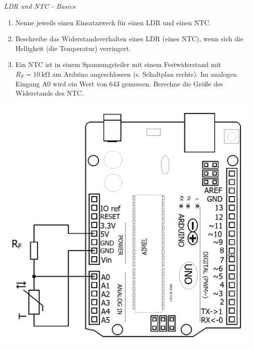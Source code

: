 \documentclass[ngerman, 11pt]{scrreprt}
\begin{document}
	\begin{aufgabe} \emph{LDR und NTC - Basics}
		
		\medskip
		\begin{minipage}{0.59\textwidth}
			\begin{enumerate}[label=\alph*), itemsep=0mm, parsep=0mm]
				\item Nenne jeweils einen Einsatzzweck für einen LDR und einen NTC.
				\item Beschreibe das Widerstandsverhalten eines LDR (eines NTC), wenn sich die Helligkeit (die Temperatur) verringert.
				\item Ein NTC ist in einem Spannungsteiler mit einem Festwiderstand mit $R_F=\SI{10}{\kilo\ohm}$ am Arduino angeschlossen (s. Schaltplan rechts). Im analogen Eingang A0 wird ein Wert von 643 gemessen. Berechne die Größe des Widerstands des NTC.
			\end{enumerate}
		\end{minipage}
		\hfill
		\begin{minipage}{0.39\textwidth}
			\centering
			\includegraphics[width=\textwidth]{../Zeichnungen/schaltplan-ntc-an-arduino.png}
		\end{minipage}
		

\end{aufgabe}
\end{document}
